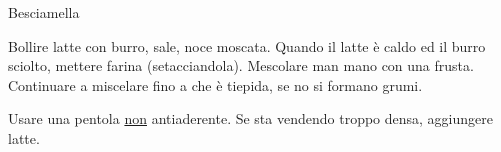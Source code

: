 \begin{recipe}[label=besciamella]{Besciamella}
    \begin{header}
    
    \end{header}
    
    
    \begin{ingredients}
    \end{ingredients}
    
    \begin{preparation}
        \step Bollire latte con burro, sale, noce moscata.
        \step Quando il latte è caldo ed il burro sciolto, mettere farina (setacciandola).
        \step Mescolare man mano con una frusta.
        \step Continuare a miscelare fino a che è tiepida, se no si formano grumi.
    \end{preparation}
    
    \begin{suggestion}
        \suggestionMark Usare una pentola \underline{non} antiaderente.
        \suggestionMark Se sta vendendo troppo densa, aggiungere latte.
    \end{suggestion}
\end{recipe}
